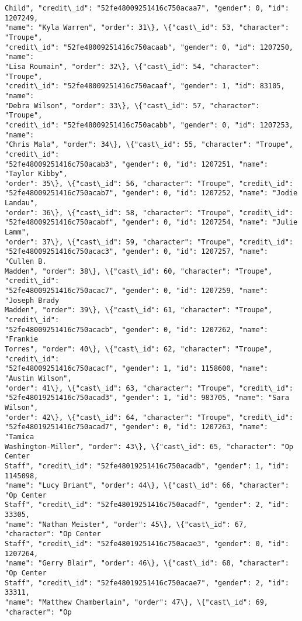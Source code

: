 \documentclass[11pt]{article}
\begin{document}
\begin{tcolorbox}[breakable, size=fbox, boxrule=.5pt, pad at break*=1mm, opacityfill=0]
\begin{Verbatim}[commandchars=\\\{\}]
Child", "credit\_id": "52fe48009251416c750acaa7", "gender": 0, "id": 1207249,
"name": "Kyla Warren", "order": 31\}, \{"cast\_id": 53, "character": "Troupe",
"credit\_id": "52fe48009251416c750acaab", "gender": 0, "id": 1207250, "name":
"Lisa Roumain", "order": 32\}, \{"cast\_id": 54, "character": "Troupe",
"credit\_id": "52fe48009251416c750acaaf", "gender": 1, "id": 83105, "name":
"Debra Wilson", "order": 33\}, \{"cast\_id": 57, "character": "Troupe",
"credit\_id": "52fe48009251416c750acabb", "gender": 0, "id": 1207253, "name":
"Chris Mala", "order": 34\}, \{"cast\_id": 55, "character": "Troupe", "credit\_id":
"52fe48009251416c750acab3", "gender": 0, "id": 1207251, "name": "Taylor Kibby",
"order": 35\}, \{"cast\_id": 56, "character": "Troupe", "credit\_id":
"52fe48009251416c750acab7", "gender": 0, "id": 1207252, "name": "Jodie Landau",
"order": 36\}, \{"cast\_id": 58, "character": "Troupe", "credit\_id":
"52fe48009251416c750acabf", "gender": 0, "id": 1207254, "name": "Julie Lamm",
"order": 37\}, \{"cast\_id": 59, "character": "Troupe", "credit\_id":
"52fe48009251416c750acac3", "gender": 0, "id": 1207257, "name": "Cullen B.
Madden", "order": 38\}, \{"cast\_id": 60, "character": "Troupe", "credit\_id":
"52fe48009251416c750acac7", "gender": 0, "id": 1207259, "name": "Joseph Brady
Madden", "order": 39\}, \{"cast\_id": 61, "character": "Troupe", "credit\_id":
"52fe48009251416c750acacb", "gender": 0, "id": 1207262, "name": "Frankie
Torres", "order": 40\}, \{"cast\_id": 62, "character": "Troupe", "credit\_id":
"52fe48009251416c750acacf", "gender": 1, "id": 1158600, "name": "Austin Wilson",
"order": 41\}, \{"cast\_id": 63, "character": "Troupe", "credit\_id":
"52fe48019251416c750acad3", "gender": 1, "id": 983705, "name": "Sara Wilson",
"order": 42\}, \{"cast\_id": 64, "character": "Troupe", "credit\_id":
"52fe48019251416c750acad7", "gender": 0, "id": 1207263, "name": "Tamica
Washington-Miller", "order": 43\}, \{"cast\_id": 65, "character": "Op Center
Staff", "credit\_id": "52fe48019251416c750acadb", "gender": 1, "id": 1145098,
"name": "Lucy Briant", "order": 44\}, \{"cast\_id": 66, "character": "Op Center
Staff", "credit\_id": "52fe48019251416c750acadf", "gender": 2, "id": 33305,
"name": "Nathan Meister", "order": 45\}, \{"cast\_id": 67, "character": "Op Center
Staff", "credit\_id": "52fe48019251416c750acae3", "gender": 0, "id": 1207264,
"name": "Gerry Blair", "order": 46\}, \{"cast\_id": 68, "character": "Op Center
Staff", "credit\_id": "52fe48019251416c750acae7", "gender": 2, "id": 33311,
"name": "Matthew Chamberlain", "order": 47\}, \{"cast\_id": 69, "character": "Op

\end{Verbatim}
\end{tcolorbox}
\end{document}
